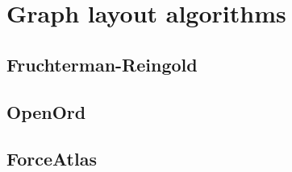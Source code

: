 \chapter{Graph layout algorithms}

\section{Fruchterman-Reingold}

\section{OpenOrd}

\section{ForceAtlas}
